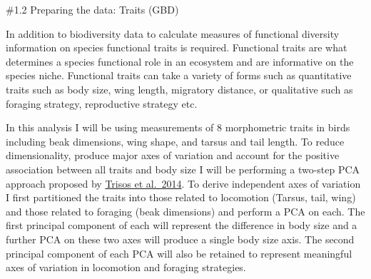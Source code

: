 \documentclass[
]{article}
\begin{document}
\#1.2 Preparing the data: Traits (GBD)

In addition to biodiversity data to calculate measures of functional
diversity information on species functional traits is required.
Functional traits are what determines a species functional role in an
ecosystem and are informative on the species niche. Functional traits
can take a variety of forms such as quantitative traits such as body
size, wing length, migratory distance, or qualitative such as foraging
strategy, reproductive strategy etc.

In this analysis I will be using measurements of 8 morphometric traits
in birds including beak dimensions, wing shape, and tarsus and tail
length. To reduce dimensionality, produce major axes of variation and
account for the positive association between all traits and body size I
will be performing a two-step PCA approach proposed by
\href{https://www.journals.uchicago.edu/doi/full/10.1086/678233}{Trisos
et al.~2014}. To derive independent axes of variation I first
partitioned the traits into those related to locomotion (Tarsus, tail,
wing) and those related to foraging (beak dimensions) and perform a PCA
on each. The first principal component of each will represent the
difference in body size and a further PCA on these two axes will produce
a single body size axis. The second principal component of each PCA will
also be retained to represent meaningful axes of variation in locomotion
and foraging strategies.
\end{document}
